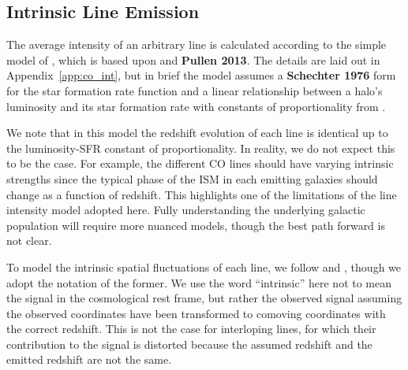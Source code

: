 \documentclass{aastex62}
\begin{document}
\subsection{Intrinsic Line Emission}\label{ssec:line_emission}
The average intensity of an arbitrary line is calculated according
to the simple model of \citet{2016ApJ...825..143L}, which is based upon
\citet{2011ApJ...741...70L} and {\bf Pullen 2013}. The details are laid out in
Appendix~\ref{app:co_int}, but in brief the model assumes a {\bf Schechter
1976} form for the star formation rate function and a linear relationship
between a halo's luminosity and its star formation rate with constants of
proportionality from \citet{2010JCAP...11..016V}.

We note that in this model the redshift evolution of each line is identical up
to the luminosity-SFR constant of proportionality. In reality, we do not
expect this to be the case. For example, the different CO lines should have
varying intrinsic strengths since the typical phase of the ISM in each
emitting galaxies should change as a function of redshift. This highlights one
of the limitations of the line intensity model adopted here. Fully
understanding the underlying galactic population will require more nuanced
models, though the best path forward is not clear.

To model the intrinsic spatial fluctuations of each line, we follow
\citet{2016ApJ...825..143L} and \citet{2016ApJ...832..165C}, though we adopt
the notation of the former. We use the word ``intrinsic'' here not to mean the
signal in the cosmological rest frame, but rather the observed signal assuming
the observed coordinates have been transformed to comoving coordinates with
the correct redshift. This is not the case for interloping lines, for which
their contribution to the signal is distorted because the assumed redshift and
the emitted redshift are not the same. 
\end{document}
